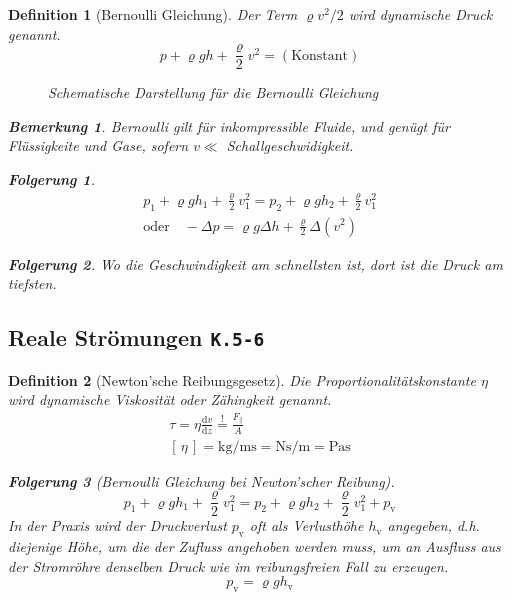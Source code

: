 \documentclass[a4paper, twocolumn]{article}
\numberwithin{equation}{section}
\theoremstyle{hsr-def}
\newtheorem{definition}{Definition}[section]
\theoremstyle{hsr-sub}
\newtheorem{result}{Folgerung}[definition]
\newtheorem{remark}{Bemerkung}[definition]
\newcommand{\dd}[1]{\ensuremath{\mathrm{d}#1}}
\newcommand{\deriv}[2]{\ensuremath{\frac{\dd{#1}}{\dd{#2}}}}
\newcommand{\unitof}[1]{\ensuremath{\left[\,#1\,\right]}}
\newcommand{\fromlecture}[1]{\textcolor{red!70!black}{\small\texttt{K.#1}}}
\begin{document}
\begin{definition}[Bernoulli Gleichung]
Der Term \(\varrho v^2 / 2\) wird \emph{dynamische Druck} genannt.
\[
    p + \varrho g h + \frac{\varrho}{2} v^2 = (\text{Konstant})
\]

\begin{figure}[h] \centering
    \resizebox{.9\linewidth}{!}{%
    }
    \caption{Schematische Darstellung f\"ur die Bernoulli Gleichung}
\end{figure}

\begin{remark}
Bernoulli gilt f\"ur inkompressible Fluide, und gen\"ugt f\"ur Fl\"ussigkeite und Gase, sofern \(v \ll \) Schallgeschwidigkeit.
\end{remark}

\begin{result}
\begin{gather*}
    p_1 + \varrho g h_1 + \frac{\varrho}{2} v_1^2
    =
    p_2 + \varrho g h_2 + \frac{\varrho}{2} v_1^2
    \\
    \text{oder}\quad -\Delta p = \varrho g \Delta h + \frac{\varrho}{2} \Delta \left( v^2 \right)
\end{gather*}
\end{result}

\begin{result}
Wo die Geschwindigkeit am schnellsten ist, dort ist die Druck am tiefsten.
\end{result}

\end{definition}

\subsection{Reale Str\"omungen \fromlecture{5-6}}

\begin{definition}[Newton'sche Reibungsgesetz]
Die Proportionalit\"atskonstante \(\eta\) wird \emph{dynamische Viskosit\"at} oder \emph{Z\"ahingkeit} genannt.
\begin{gather*}
    \tau = \eta \deriv{v}{z}
    \stackrel{!}{=} \frac{F_\parallel}{A}  \\
    \unitof{\eta}  
    = \si{\kilo\gram\per\metre\second}
    = \si{\newton\second\per\metre}
    = \si{\pascal\second}
\end{gather*}

\begin{result}[Bernoulli Gleichung bei Newton'scher Reibung]
\[
    p_1 + \varrho g h_1 + \frac{\varrho}{2} v_1^2
    =
    p_2 + \varrho g h_2 + \frac{\varrho}{2} v_1^2 + p_\text{v}
\]
In der Praxis wird der Druckverlust \(p_\text{v}\) oft als Verlusth\"ohe \(h_\text{v}\) angegeben, d.h. diejenige H\"ohe, um die der Zufluss angehoben werden muss, um an Ausfluss aus der Stromr\"ohre denselben Druck wie im reibungsfreien Fall zu erzeugen.
\[
    p_\text{v} = \varrho g h_\text{v}  
\]
\end{result}
\end{definition}
\end{document}

